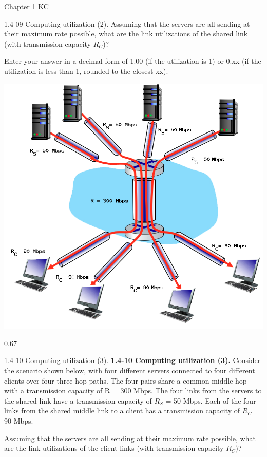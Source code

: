 \documentclass[a4paper]{article}
\begin{document}
\begin{quiz}{Chapter 1 KC}
\begin{shortanswer}[points=1]{1.4-09 Computing utilization (2).}
Assuming that the servers are all sending at their maximum rate possible, what are the link utilizations of the shared link (with transmission capacity $R_C$)? 

Enter your answer in a decimal form of 1.00 (if the utilization is 1) or 0.xx (if the utilization is less than 1, rounded to the closest xx). 

\begin{center}
\includegraphics[width=\linewidth]{figs/1.4.7.png}
\end{center}
\item* 0.67
\end{shortanswer}

\begin{shortanswer}[points=1]{1.4-10 Computing utilization (3).}
\textbf{1.4-10 Computing utilization (3).} 
Consider the scenario shown below, with four different servers connected to four different clients over four three-hop paths. The four pairs share a common middle hop with a transmission capacity of R = 300 Mbps. The four links from the servers to the shared link have a transmission capacity of $R_S$ = 50 Mbps. Each of the four links from the shared middle link to a client has a transmission capacity of $R_C$ = 90 Mbps. 

Assuming that the servers are all sending at their maximum rate possible, what are the link utilizations of the client links (with transmission capacity $R_C$)? 


\end{shortanswer}
\end{quiz}
\end{document}
